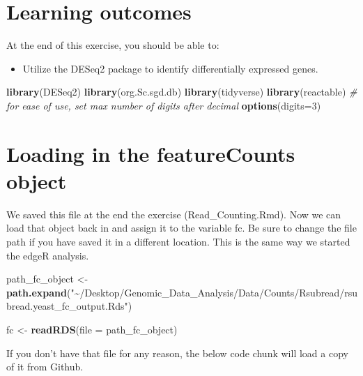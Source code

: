 \documentclass[
]{book}
\newenvironment{Shaded}{\begin{snugshade}}{\end{snugshade}}
\newcommand{\AttributeTok}[1]{\textcolor[rgb]{0.13,0.29,0.53}{#1}}
\newcommand{\CommentTok}[1]{\textcolor[rgb]{0.56,0.35,0.01}{\textit{#1}}}
\newcommand{\DecValTok}[1]{\textcolor[rgb]{0.00,0.00,0.81}{#1}}
\newcommand{\FunctionTok}[1]{\textcolor[rgb]{0.13,0.29,0.53}{\textbf{#1}}}
\newcommand{\NormalTok}[1]{#1}
\newcommand{\OtherTok}[1]{\textcolor[rgb]{0.56,0.35,0.01}{#1}}
\newcommand{\StringTok}[1]{\textcolor[rgb]{0.31,0.60,0.02}{#1}}
\providecommand{\tightlist}{%
  \setlength{\itemsep}{0pt}\setlength{\parskip}{0pt}}
\begin{document}
\hypertarget{learning-outcomes-4}{%
\section{Learning outcomes}\label{learning-outcomes-4}}

At the end of this exercise, you should be able to:

\begin{itemize}
\tightlist
\item
  Utilize the DESeq2 package to identify differentially expressed genes.
\end{itemize}

\begin{Shaded}
\begin{Highlighting}[]
\FunctionTok{library}\NormalTok{(DESeq2)}
\FunctionTok{library}\NormalTok{(org.Sc.sgd.db)}
\FunctionTok{library}\NormalTok{(tidyverse)}
\FunctionTok{library}\NormalTok{(reactable)}
\CommentTok{\# for ease of use, set max number of digits after decimal}
\FunctionTok{options}\NormalTok{(}\AttributeTok{digits=}\DecValTok{3}\NormalTok{)}
\end{Highlighting}
\end{Shaded}

\hypertarget{loading-in-the-featurecounts-object-1}{%
\section{Loading in the featureCounts object}\label{loading-in-the-featurecounts-object-1}}

We saved this file at the end the exercise (Read\_Counting.Rmd). Now we can load that object back in and assign it to the variable fc. Be sure to change the file path if you have saved it in a different location. This is the same way we started the edgeR analysis.

\begin{Shaded}
\begin{Highlighting}[]
\NormalTok{path\_fc\_object }\OtherTok{\textless{}{-}} \FunctionTok{path.expand}\NormalTok{(}\StringTok{"\textasciitilde{}/Desktop/Genomic\_Data\_Analysis/Data/Counts/Rsubread/rsubread.yeast\_fc\_output.Rds"}\NormalTok{)}

\NormalTok{fc }\OtherTok{\textless{}{-}} \FunctionTok{readRDS}\NormalTok{(}\AttributeTok{file =}\NormalTok{ path\_fc\_object)}
\end{Highlighting}
\end{Shaded}

If you don't have that file for any reason, the below code chunk will load a copy of it from Github.
\end{document}

